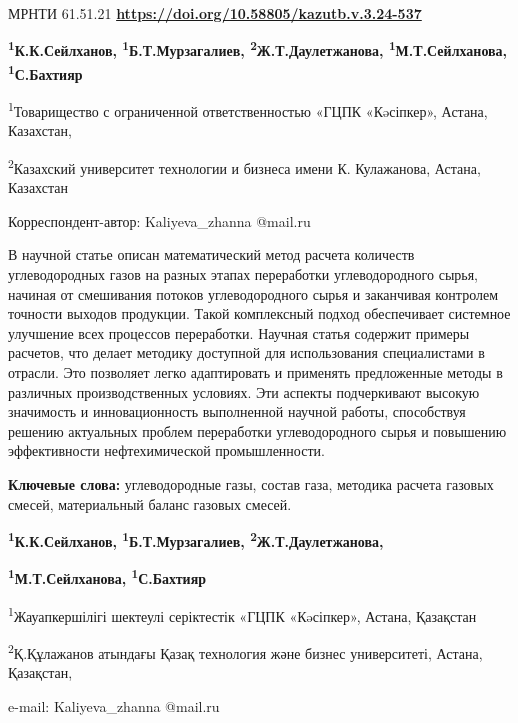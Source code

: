 \newpage
МРНТИ 61.51.21
\hfill {\bfseries \href{https://doi.org/10.58805/kazutb.v.3.24-537}{https://doi.org/10.58805/kazutb.v.3.24-537}}


\begin{center}
{\bfseries \textsuperscript{1}К.К.Сейлханов,
\textsuperscript{1}Б.Т.Мурзагалиев,
\textsuperscript{2}Ж.Т.Даулетжанова\envelope, \textsuperscript{1}М.Т.Сейлханова, \textsuperscript{1}С.Бахтияр}

\textsuperscript{1}Товарищество с ограниченной ответственностью «ГЦПК
«Кəсіпкер», Астана, Казахстан,

\textsuperscript{2}Казахский университет технологии и бизнеса имени К.
Кулажанова, Астана, Казахстан

\envelope Корреспондент-автор: Kaliyeva\_zhanna
@mail.ru
\end{center}

В научной статье описан математический метод расчета количеств
углеводородных газов на разных этапах переработки углеводородного сырья,
начиная от смешивания потоков углеводородного сырья и заканчивая
контролем точности выходов продукции. Такой комплексный подход
обеспечивает системное улучшение всех процессов переработки. Научная
статья содержит примеры расчетов, что делает методику доступной для
использования специалистами в отрасли. Это позволяет легко адаптировать
и применять предложенные методы в различных производственных условиях.
Эти аспекты подчеркивают высокую значимость и инновационность
выполненной научной работы, способствуя решению актуальных проблем
переработки углеводородного сырья и повышению эффективности
нефтехимической промышленности.

{\bfseries Ключевые слова:} углеводородные газы, состав газа, методика
расчета газовых смесей, материальный баланс газовых смесей.


\begin{center}
{\bfseries \textsuperscript{1}К.К.Сейлханов,
\textsuperscript{1}Б.Т.Мурзагалиев,
\textsuperscript{2}Ж.Т.Даулетжанова\envelope,}

{\bfseries \textsuperscript{1}М.Т.Сейлханова, \textsuperscript{1}С.Бахтияр}

\textsuperscript{1}Жауапкершілігі шектеулі серіктестік «ГЦПК «Кəсіпкер»,
Астана, Қазақстан

\textsuperscript{2}Қ.Құлажанов атындағы Қазақ технология және бизнес
университеті, Астана, Қазақстан,

e-mail: Kaliyeva\_zhanna @mail.ru
\end{center}

